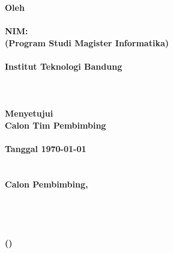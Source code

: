 \clearpage
{}
\begin{center}
  \smallskip
  \large \bfseries \MakeUppercase{\Title}\\
  \hfill\\
  \hfill\\
  \normalsize \normalfont Oleh\\
  \large \bfseries \AuthorName\\
  NIM:~\uppercase{\AuthorNIM}\\
  \normalsize (Program Studi Magister Informatika)\\
  \hfill\\
  \normalsize \normalfont Institut Teknologi Bandung \\
  \hfill\\
  \hfill\\
  \hfill\\
  Menyetujui\\
  Calon Tim Pembimbing\\
  \hfill\\
  Tanggal \today \\
  \hfill\\
  \hfill\\
  Calon Pembimbing,\\
  \hfill\\
  \hfill\\
  \hfill\\
  \hfill\\
  (\SupervisorName) \\
\end{center}